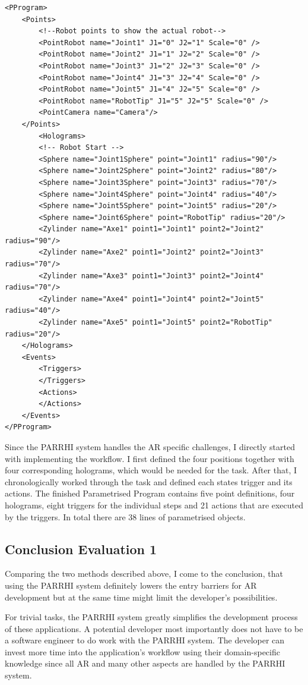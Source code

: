 \begin{lstlisting}
<PProgram>
	<Points>
		<!--Robot points to show the actual robot-->
		<PointRobot name="Joint1" J1="0" J2="1" Scale="0" />
		<PointRobot name="Joint2" J1="1" J2="2" Scale="0" />
		<PointRobot name="Joint3" J1="2" J2="3" Scale="0" />
		<PointRobot name="Joint4" J1="3" J2="4" Scale="0" />
		<PointRobot name="Joint5" J1="4" J2="5" Scale="0" />
		<PointRobot name="RobotTip" J1="5" J2="5" Scale="0" />
		<PointCamera name="Camera"/>
	</Points>
		<Holograms>
		<!-- Robot Start -->
		<Sphere name="Joint1Sphere" point="Joint1" radius="90"/>
		<Sphere name="Joint2Sphere" point="Joint2" radius="80"/>
		<Sphere name="Joint3Sphere" point="Joint3" radius="70"/>
		<Sphere name="Joint4Sphere" point="Joint4" radius="40"/>
		<Sphere name="Joint5Sphere" point="Joint5" radius="20"/>
		<Sphere name="Joint6Sphere" point="RobotTip" radius="20"/>
		<Zylinder name="Axe1" point1="Joint1" point2="Joint2" radius="90"/>
		<Zylinder name="Axe2" point1="Joint2" point2="Joint3" radius="70"/>
		<Zylinder name="Axe3" point1="Joint3" point2="Joint4" radius="70"/>
		<Zylinder name="Axe4" point1="Joint4" point2="Joint5" radius="40"/>
		<Zylinder name="Axe5" point1="Joint5" point2="RobotTip" radius="20"/>
	</Holograms>
	<Events>
		<Triggers>
		</Triggers>
		<Actions>
		</Actions>
	</Events>
</PProgram>
\end{lstlisting}

Since the PARRHI system handles the AR specific challenges, I directly started with implementing the workflow. I first defined the four positions together with four corresponding holograms, which would be needed for the task. After that, I chronologically worked through the task and defined each states trigger and its actions. The finished Parametrised Program contains five point definitions, four holograms, eight triggers for the individual steps and 21 actions that are executed by the triggers. In total there are 38 lines of parametrised objects. 

\subsection{Conclusion Evaluation 1}
Comparing the two methods described above, I come to the conclusion, that using the PARRHI system definitely lowers the entry barriers for AR development but at the same time might limit the developer's possibilities. 

For trivial tasks, the PARRHI system greatly simplifies the development process of these applications. A potential developer most importantly does not have to be a software engineer to do work with the PARRHI system. The developer can invest more time into the application's workflow using their domain-specific knowledge since all AR and many other aspects are handled by the PARRHI system.

